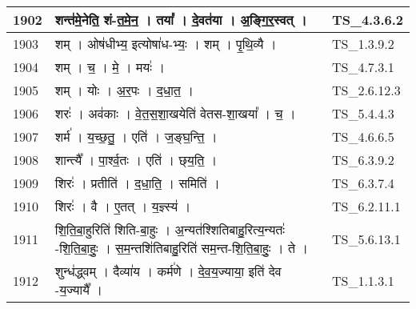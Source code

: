 \documentclass[17pt]{extarticle}
\begin{document}
\begin{longtable}{||p{0.4in}||p{4.9in}||p{0.9in}||}
    1902 & शन्त॑मे॒नेति॒ शं{-}त॒मे॒न॒   ।   तया᳚   ।   दे॒वत॑या   ।   अ॒ङ्गि॒र॒स्वत्   ।    & TS\_4.3.6.2       \\
    
    \hline
        
    1903 & शम्   ।   ओष॑धीभ्य॒ इत्योषा॑ध{-}भ्यः॒   ।   शम्   ।   पृ॒थि॒व्यै   ।    & TS\_1.3.9.2       \\
    
    \hline
        
    1904 & शम्   ।   च॒   ।   मे॒   ।   मयः॑   ।    & TS\_4.7.3.1       \\
    
    \hline
        
    1905 & शम्   ।   योः   ।   अ॒र॒पः   ।   द॒धा॒त॒   ।    & TS\_2.6.12.3       \\
    
    \hline
        
    1906 & शरः॑   ।   अव॑काः   ।   वे॒त॒स॒शा॒खयेति॑ वेतस{-}शा॒खया᳚   ।   च॒   ।    & TS\_5.4.4.3       \\
    
    \hline
        
    1907 & शर्म॑   ।   य॒च्छ॒तु॒   ।   एति॑   ।   ज॒ङ्घ॒न्ति॒   ।    & TS\_4.6.6.5       \\
    
    \hline
        
    1908 & शान्त्यै᳚   ।   पा॒र्श्व॒तः   ।   एति॑   ।   छ्‌य॒ति॒   ।    & TS\_6.3.9.2       \\
    
    \hline
        
    1909 & शिरः॑   ।   प्रतीति॑   ।   द॒धा॒ति॒   ।   समिति॑   ।    & TS\_6.3.7.4       \\
    
    \hline
        
    1910 & शिरः॑   ।   वै   ।   ए॒तत्   ।   य॒ज्ञ्स्य॑   ।    & TS\_6.2.11.1       \\
    
    \hline
        
    1911 & शि॒ति॒बा॒हुरिति॑ शिति{-}बा॒हुः   ।   अ॒न्यत॑श्शितिबाहु॒रित्य॒न्यतः॑ {-}शि॒ति॒बा॒हुः॒   ।   स॒म॒न्तशि॑तिबाहु॒रिति॑ सम॒न्त{-}शि॒ति॒बा॒हुः॒   ।   ते   ।    & TS\_5.6.13.1       \\
    
    \hline
        
    1912 & शुन्ध॑द्ध्वम्   ।   दैव्या॑य   ।   कर्म॑णे   ।   दे॒व॒य॒ज्याया॒ इति॑ देव {-}य॒ज्यायै᳚   ।    & TS\_1.1.3.1       \\
    

\end{longtable}
\end{document}
